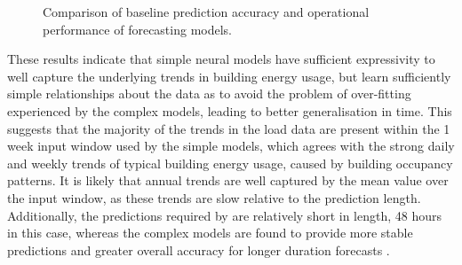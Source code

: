 \begin{figure}[ph!]
\centering
{}
\bigskip

\bigskip

\hspace*{\fill}
%
\hspace*{\fill}
\hspace*{\fill}

\smallskip
\caption{Comparison of baseline prediction accuracy and operational performance of forecasting models.}
\label{fig:forecasting-baseline-comparison}
\end{figure}

These results indicate that simple neural models have sufficient expressivity to well capture the underlying trends in building energy usage, but learn sufficiently simple relationships about the data as to avoid the problem of over-fitting experienced by the complex models, leading to better generalisation in time. This suggests that the majority of the trends in the load data are present within the 1 week input window used by the simple models, which agrees with the strong daily and weekly trends of typical building energy usage, caused by building occupancy patterns. It is likely that annual trends are well captured by the mean value over the input window, as these trends are slow relative to the prediction length. Additionally, the predictions required by  are relatively short in length, 48 hours in this case, whereas the complex models are found to provide more stable predictions and greater overall accuracy for longer duration forecasts \citep{challu2023NHITSNeuralHierarchical,zhang2022TemporalFusionTransformer}.

